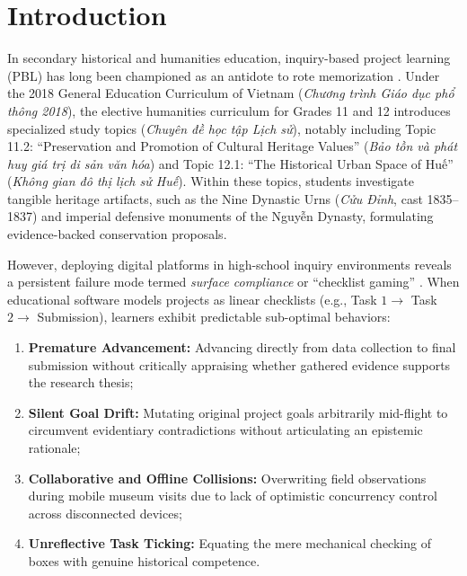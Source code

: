 \documentclass[11pt,a4paper]{article}
\begin{document}
\section{Introduction}

In secondary historical and humanities education, inquiry-based project learning (PBL) has long been championed as an antidote to rote memorization \cite{zimmerman2000attaining, pintrich2004conceptual}. Under the 2018 General Education Curriculum of Vietnam (\textit{Chương trình Giáo dục phổ thông 2018}), the elective humanities curriculum for Grades 11 and 12 introduces specialized study topics (\textit{Chuyên đề học tập Lịch sử}), notably including Topic 11.2: ``Preservation and Promotion of Cultural Heritage Values'' (\textit{Bảo tồn và phát huy giá trị di sản văn hóa}) and Topic 12.1: ``The Historical Urban Space of Huế'' (\textit{Không gian đô thị lịch sử Huế}). Within these topics, students investigate tangible heritage artifacts, such as the Nine Dynastic Urns (\textit{Cửu Đỉnh}, cast 1835--1837) and imperial defensive monuments of the Nguyễn Dynasty, formulating evidence-backed conservation proposals.

However, deploying digital platforms in high-school inquiry environments reveals a persistent failure mode termed \textit{surface compliance} or ``checklist gaming'' \cite{baker2008gaming, azevedo2005scaffolding}. When educational software models projects as linear checklists (e.g., Task $1 \to$ Task $2 \to$ Submission), learners exhibit predictable sub-optimal behaviors:
\begin{enumerate}[label=(\alph*)]
    \item \textbf{Premature Advancement:} Advancing directly from data collection to final submission without critically appraising whether gathered evidence supports the research thesis;
    \item \textbf{Silent Goal Drift:} Mutating original project goals arbitrarily mid-flight to circumvent evidentiary contradictions without articulating an epistemic rationale;
    \item \textbf{Collaborative and Offline Collisions:} Overwriting field observations during mobile museum visits due to lack of optimistic concurrency control across disconnected devices;
    \item \textbf{Unreflective Task Ticking:} Equating the mere mechanical checking of boxes with genuine historical competence.
\end{enumerate}
\end{document}
